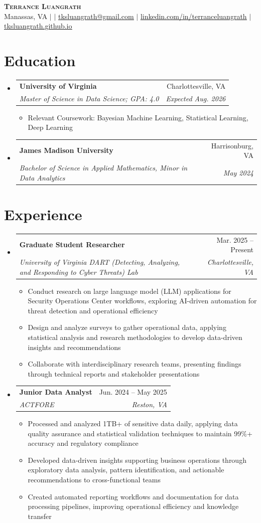 \documentclass[letterpaper,11pt]{article}
\makeatletter
\newcommand{\resumeItem}[1]{
  \item\small{
    {#1 \vspace{-2pt}}
  }
}
\newcommand{\resumeSubheading}[4]{
  \vspace{-2pt}\item
    \begin{tabular*}{0.97\textwidth}[t]{l@{\extracolsep{\fill}}r}
      \textbf{#1} & #2 \\
      \textit{\small#3} & \textit{\small #4} \\
    \end{tabular*}\vspace{-7pt}
}
\newcommand{\resumeSubHeadingListStart}{\begin{itemize}[leftmargin=0.15in, label={}]}
\newcommand{\resumeSubHeadingListEnd}{\end{itemize}}
\newcommand{\resumeItemListStart}{\begin{itemize}}
\newcommand{\resumeItemListEnd}{\end{itemize}\vspace{-5pt}}
\makeatother
\begin{document}
\begin{center}
    \textbf{\Huge \scshape Terrance Luangrath} \\ \vspace{1pt}
    \small Manassas, VA $|$  $|$ \href{mailto:tksluangrath@gmail.com}{\underline{tksluangrath@gmail.com}}
 $|$ \href{https://linkedin.com/in/terranceluangrath}{\underline{linkedin.com/in/terranceluangrath}} $|$ \href{https://tksluangrath.github.io}{\underline{tksluangrath.github.io}}\end{center}

\section{Education}
  \resumeSubHeadingListStart
    \resumeSubheading
      {University of Virginia}{Charlottesville, VA}
      {Master of Science in Data Science; GPA: 4.0}{Expected Aug. 2026}
      \resumeItemListStart
        \resumeItem{Relevant Coursework: Bayesian Machine Learning, Statistical Learning, Deep Learning}
      \resumeItemListEnd
    \resumeSubheading
      {James Madison University}{Harrisonburg, VA}
      {Bachelor of Science in Applied Mathematics, Minor in Data Analytics}{May 2024}
  \resumeSubHeadingListEnd

\section{Experience}
  \resumeSubHeadingListStart
    \resumeSubheading
      {Graduate Student Researcher}{Mar. 2025 -- Present}
      {University of Virginia DART (Detecting, Analyzing, and Responding to Cyber Threats) Lab}{Charlottesville, VA}
      \resumeItemListStart
        \resumeItem{Conduct research on large language model (LLM) applications for Security Operations Center workflows, exploring AI-driven automation for threat detection and operational efficiency}
        \resumeItem{Design and analyze surveys to gather operational data, applying statistical analysis and research methodologies to develop data-driven insights and recommendations}
        \resumeItem{Collaborate with interdisciplinary research teams, presenting findings through technical reports and stakeholder presentations}
      \resumeItemListEnd
    \resumeSubheading
      {Junior Data Analyst}{Jun. 2024 -- May 2025}
      {ACTFORE}{Reston, VA}
      \resumeItemListStart
        \resumeItem{Processed and analyzed 1TB+ of sensitive data daily, applying data quality assurance and statistical validation techniques to maintain 99\%+ accuracy and regulatory compliance}
        \resumeItem{Developed data-driven insights supporting business operations through exploratory data analysis, pattern identification, and actionable recommendations to cross-functional teams}
        \resumeItem{Created automated reporting workflows and documentation for data processing pipelines, improving operational efficiency and knowledge transfer}
      \resumeItemListEnd
  \resumeSubHeadingListEnd
\end{document}
